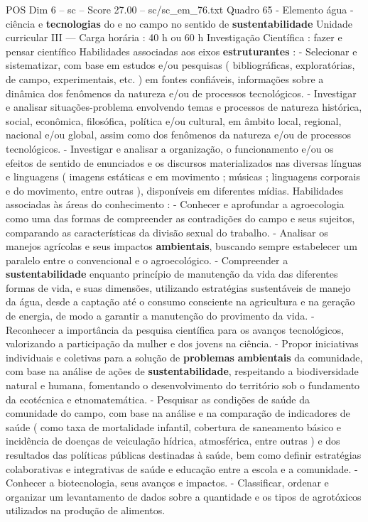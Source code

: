 \begin{textsample}{POS Dim 6 – sc – Score 27.00 – sc/sc\_em\_76.txt}
Quadro 65 - Elemento água - ciência e \textbf{tecnologias} do e no campo no sentido de \textbf{sustentabilidade} Unidade curricular III — Carga horária : 40 h ou 60 h Investigação Científica : fazer e pensar científico Habilidades associadas aos eixos \textbf{estruturantes} : - Selecionar e sistematizar, com base em estudos e/ou pesquisas ( bibliográficas, exploratórias, de campo, experimentais, etc. ) em fontes confiáveis, informações sobre a dinâmica dos fenômenos da natureza e/ou de processos tecnológicos. - Investigar e analisar situações-problema envolvendo temas e processos de natureza histórica, social, econômica, filosófica, política e/ou cultural, em âmbito local, regional, nacional e/ou global, assim como dos fenômenos da natureza e/ou de processos tecnológicos. - Investigar e analisar a organização, o funcionamento e/ou os efeitos de sentido de enunciados e os discursos materializados nas diversas línguas e linguagens ( imagens estáticas e em movimento ; músicas ; linguagens corporais e do movimento, entre outras ), disponíveis em diferentes mídias.
Habilidades associadas às áreas do conhecimento : - Conhecer e aprofundar a agroecologia como uma das formas de compreender as contradições do campo e seus sujeitos, comparando as características da divisão sexual do trabalho. - Analisar os manejos agrícolas e seus impactos \textbf{ambientais}, buscando sempre estabelecer um paralelo entre o convencional e o agroecológico. - Compreender a \textbf{sustentabilidade} enquanto princípio de manutenção da vida das diferentes formas de vida, e suas dimensões, utilizando estratégias sustentáveis de manejo da água, desde a captação até o consumo consciente na agricultura e na geração de energia, de modo a garantir a manutenção do provimento da vida. - Reconhecer a importância da pesquisa científica para os avanços tecnológicos, valorizando a participação da mulher e dos jovens na ciência. - Propor iniciativas individuais e coletivas para a solução de \textbf{problemas} \textbf{ambientais} da comunidade, com base na análise de ações de \textbf{sustentabilidade}, respeitando a biodiversidade natural e humana, fomentando o desenvolvimento do território sob o fundamento da ecotécnica e etnomatemática. - Pesquisar as condições de saúde da comunidade do campo, com base na análise e na comparação de indicadores de saúde ( como taxa de mortalidade infantil, cobertura de saneamento básico e incidência de doenças de veiculação hídrica, atmosférica, entre outras ) e dos resultados das políticas públicas destinadas à saúde, bem como definir estratégias colaborativas e integrativas de saúde e educação entre a escola e a comunidade. - Conhecer a biotecnologia, seus avanços e impactos. - Classificar, ordenar e organizar um levantamento de dados sobre a quantidade e os tipos de agrotóxicos utilizados na produção de alimentos.

\end{textsample}
